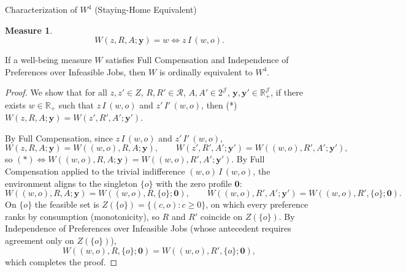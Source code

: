 \documentclass[10pt]{beamer}
\newtheorem{Measure}{Measure}
\begin{document}
\begin{frame}[allowframebreaks]{Characterization of $W^4$ (Staying-Home Equivalent)}
\hypertarget{char:w4}{}%
\hyperlink{tab:classification}{}
\begin{Measure}
    \begin{equation*}
\label{ }
W(z, R, A;\mathbf{y})=w\Leftrightarrow z\,I\,(w,o).
\end{equation*}

\end{Measure}
\scriptsize
\begin{theorem}[$W^4$]
If a well-being measure $W$ satisfies Full Compensation and Independence of
Preferences over Infeasible Jobs, then $W$ is ordinally equivalent to $W^4$.
\end{theorem}

\begin{proof}
We show that for all $z,z'\in Z$, $R,R'\in\mathcal R$, $A,A'\in 2^{\mathcal J}$,
$\mathbf y,\mathbf y'\in\mathbb R_+^{\mathcal J}$, if there exists
$w\in\mathbb R_+$ such that $z\,I\,(w,o)$ and $z'\,I'\,(w,o)$, then (*)
$W(z,R,A;\mathbf y)=W(z',R',A';\mathbf y')$.

By Full Compensation, since $z\,I\,(w,o)$ and $z'\,I'\,(w,o)$,
\begin{equation*}
W(z,R,A;\mathbf y)=W((w,o),R,A;\mathbf y),\qquad
W(z',R',A';\mathbf y')=W((w,o),R',A';\mathbf y'),
\end{equation*}
so $(*)\Leftrightarrow W((w,o),R,A;\mathbf y)=W((w,o),R',A';\mathbf y')$. By
Full Compensation applied to the trivial indifference $(w,o)\,I\,(w,o)$, the
environment aligns to the singleton $\{o\}$ with the zero profile $\mathbf 0$:
\begin{equation*}
W((w,o),R,A;\mathbf y)=W((w,o),R,\{o\};\mathbf 0),\qquad
W((w,o),R',A';\mathbf y')=W((w,o),R',\{o\};\mathbf 0).
\end{equation*}
On $\{o\}$ the feasible set is $Z(\{o\})=\{(c,o):c\geq 0\}$, on which every
preference ranks by consumption (monotonicity), so $R$ and $R'$ coincide on
$Z(\{o\})$. By Independence of Preferences over Infeasible Jobs (whose
antecedent requires agreement only on $Z(\{o\})$),
\begin{equation*}
W((w,o),R,\{o\};\mathbf 0)=W((w,o),R',\{o\};\mathbf 0),
\end{equation*}
which completes the proof.
\end{proof}

\medskip
\hyperlink{tab:classification}{}
\end{frame}
\end{document}
